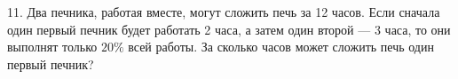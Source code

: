 11. Два печника, работая вместе, могут сложить печь за 12 часов. Если сначала один первый печник будет работать 2 часа, а затем один второй --- 3 часа, то они выполнят только $20\%$ всей работы. За сколько часов может сложить печь один первый печник?\\
